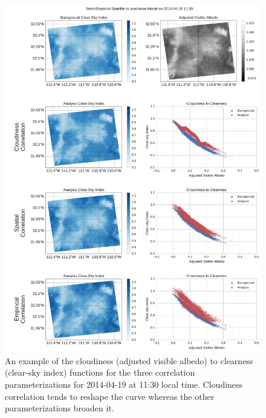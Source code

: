 \begin{figure}[p]
\centering
\includegraphics[width=\textwidth]{figs/cld_to_clear_Semi-Empirical_2014-04-19.pdf}
\caption[Clearness versus Cloudiness for SE model on 4/19]{An example
  of the cloudiness (adjusted visible albedo) to clearness (clear-sky
  index) functions for the three correlation parameterizations for
  2014-04-19 at 11:30 local time. Cloudiness correlation tends to
  reshape the curve whereas the other parameterizations broaden it.}
\label{fig:cldclr_se_419}
\end{figure}

